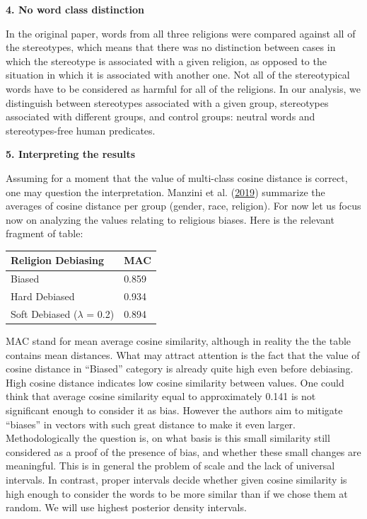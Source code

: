 \documentclass[12pt,]{book}
\begin{document}
\textbf{4. No word class distinction}

In the original paper, words from all three religions were compared
against all of the stereotypes, which means that there was no
distinction between cases in which the stereotype is associated with a
given religion, as opposed to the situation in which it is associated
with another one. Not all of the stereotypical words have to be
considered as harmful for all of the religions. In our analysis, we
distinguish between stereotypes associated with a given group,
stereotypes associated with different groups, and control groups:
neutral words and stereotypes-free human predicates.

\textbf{5. Interpreting the results}

Assuming for a moment that the value of multi-class cosine distance is
correct, one may question the interpretation. Manzini et al.
(\protect\hyperlink{ref-Manzini2019blackToCriminal}{2019}) summarize the
averages of cosine distance per group (gender, race, religion). For now
let us focus now on analyzing the values relating to religious biases.
Here is the relevant fragment of table:

\begin{longtable}[]{@{}ll@{}}
\toprule
Religion Debiasing & MAC\tabularnewline
\midrule
\endhead
Biased & 0.859\tabularnewline
Hard Debiased & 0.934\tabularnewline
Soft Debiased (\(\lambda\) = 0.2) & 0.894\tabularnewline
\bottomrule
\end{longtable}

MAC stand for mean average cosine similarity, although in reality the
the table contains mean distances. What may attract attention is the
fact that the value of cosine distance in ``Biased'' category is already
quite high even before debiasing. High cosine distance indicates low
cosine similarity between values. One could think that average cosine
similarity equal to approximately 0.141 is not significant enough to
consider it as bias. However the authors aim to mitigate ``biases'' in
vectors with such great distance to make it even larger.
Methodologically the question is, on what basis is this small similarity
still considered as a proof of the presence of bias, and whether these
small changes are meaningful. This is in general the problem of scale
and the lack of universal intervals. In contrast, proper intervals
decide whether given cosine similarity is high enough to consider the
words to be more similar than if we chose them at random. We will use
highest posterior density intervals.
\end{document}
